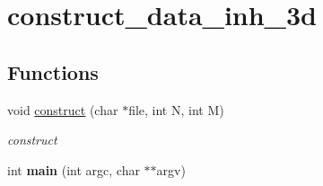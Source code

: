 \hypertarget{group__applications__mri2d__construct__data__inh__3d}{
\section{construct\_\-data\_\-inh\_\-3d}
\label{group__applications__mri2d__construct__data__inh__3d}
}
\subsection*{Functions}
\begin{CompactItemize}
\item 
\hypertarget{group__applications__mri2d__construct__data__inh__3d_ga0}{
void \hyperlink{group__applications__mri2d__construct__data__inh__3d_ga0}{construct} (char $\ast$file, int N, int M)}
\label{group__applications__mri2d__construct__data__inh__3d_ga0}

\begin{CompactList}\small\item\em construct \item\end{CompactList}\item 
\hypertarget{group__applications__mri2d__construct__data__inh__3d_ga1}{
int {\bf main} (int argc, char $\ast$$\ast$argv)}
\label{group__applications__mri2d__construct__data__inh__3d_ga1}

\end{CompactItemize}
